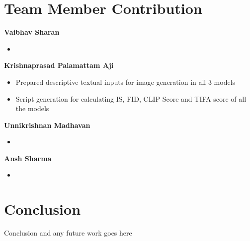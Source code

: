 \documentclass{article}
\begin{document}


\section{Team Member Contribution}
\textbf{Vaibhav Sharan}
\begin{itemize}
    \item 
\end{itemize}
\textbf{Krishnaprasad Palamattam Aji}
\begin{itemize}
    \item Prepared descriptive textual inputs for image generation in all 3 models
    \item Script generation for calculating IS, FID, CLIP Score and TIFA score of all the models
\end{itemize}
\textbf{Unnikrishnan Madhavan}
\begin{itemize}
    \item 
\end{itemize}
\textbf{Ansh Sharma}
\begin{itemize}
    \item 
\end{itemize}

\section{Conclusion}
Conclusion and any future work goes here


\pagebreak

  
  
\end{document}
